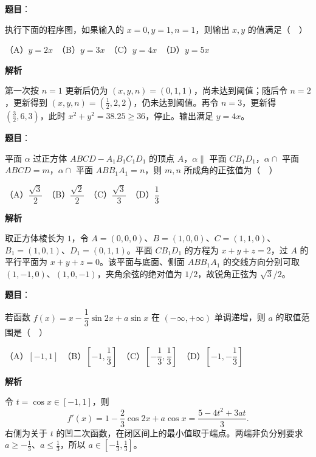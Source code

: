 \begin{answer}

\textbf{题目}：

执行下面的程序图，如果输入的 \(x=0,y=1,n=1\)，则输出 \(x,y\) 的值满足（　）
\nopagebreak[4]
\begin{center}\end{center}
\nopagebreak[4]
   （A）\(y=2x\)　（B）\(y=3x\)　（C）\(y=4x\)　（D）\(y=5x\)

\textbf{解析}

第一次按 \(n=1\) 更新后仍为 \((x,y,n)=(0,1,1)\)，尚未达到阈值；随后令 \(n=2\)，更新得到 \((x,y,n)=(\frac12,2,2)\)，仍未达到阈值。再令 \(n=3\)，更新得 \((\frac32,6,3)\)，此时 \(x^2+y^2=38.25\ge36\)，停止。输出满足 \(y=4x\)。


\end{answer}
\begin{answer}

\textbf{题目}：

平面 \(\alpha\) 过正方体 \(ABCD-A_1B_1C_1D_1\) 的顶点 \(A\)，\(\alpha\parallel\) 平面 \(CB_1D_1\)，\(\alpha\cap\) 平面 \(ABCD=m\)，\(\alpha\cap\) 平面 \(ABB_1A_1=n\)，则 \(m,n\) 所成角的正弦值为（　）

   （A）\(\dfrac{\sqrt{3}}{2}\)　（B）\(\dfrac{\sqrt{2}}{2}\)　（C）\(\dfrac{\sqrt{3}}{3}\)　（D）\(\dfrac{1}{3}\)

\textbf{解析}

取正方体棱长为 \(1\)，令 \(A=(0,0,0)\)、\(B=(1,0,0)\)、\(C=(1,1,0)\)、\(B_1=(1,0,1)\)、\(D_1=(0,1,1)\)。平面 \(CB_1D_1\) 的方程为 \(x+y+z=2\)，过 \(A\) 的平行平面为 \(x+y+z=0\)。该平面与底面、侧面 \(ABB_1A_1\) 的交线方向分别可取 \((1,-1,0)\)、\((1,0,-1)\)，夹角余弦的绝对值为 \(1/2\)，故锐角正弦为 \(\sqrt3/2\)。


\end{answer}
\begin{answer}

\textbf{题目}：

若函数 \(f(x)=x-\dfrac{1}{3}\sin 2x+a\sin x\) 在 \(( -\infty,+\infty )\) 单调递增，则 \(a\) 的取值范围是（　）

   （A）\([-1,1]\)　（B）\([-1,\dfrac{1}{3}]\)　（C）\([-\dfrac{1}{3},\dfrac{1}{3}]\)　（D）\([-1,-\dfrac{1}{3}]\)

\textbf{解析}

令 \(t=\cos x\in[-1,1]\)，则
\nopagebreak[4]
\[
f'(x)=1-\frac23\cos2x+a\cos x
=\frac{5-4t^2+3at}{3}.
\]
右侧为关于 \(t\) 的凹二次函数，在闭区间上的最小值取于端点。两端非负分别要求 \(a\ge-\frac13\)、\(a\le\frac13\)，所以 \(a\in[-\frac13,\frac13]\)。


\end{answer}


